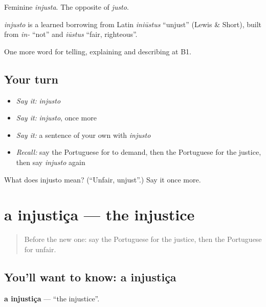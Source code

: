 Feminine \emph{injusta}. The opposite of \emph{justo}.

\begin{cousinweb}
\emph{injusto} is a learned borrowing from Latin \emph{iniūstus} \textquotedblleft{}unjust\textquotedblright{} (Lewis \& Short), built from \emph{in-} \textquotedblleft{}not\textquotedblright{} and \emph{iūstus} \textquotedblleft{}fair, righteous\textquotedblright{}.
\end{cousinweb}

\begin{grammarlens}[title={What you've built}]
One more word for telling, explaining and describing at B1.
\end{grammarlens}

\subsection*{Your turn}
\begin{itemize}
\raggedright
  \item \emph{Say it:} \emph{injusto}
  \item \emph{Say it:} \emph{injusto}, once more
  \item \emph{Say it:} a sentence of your own with \emph{injusto}
  \item \emph{Recall:} say the Portuguese for to demand, then the Portuguese for the justice, then say \emph{injusto} again
\end{itemize}

\begin{tcolorbox}[breakable,colback=teal!4,colframe=teal!35!black,title={Before you move on}]
What does injusto mean? (\textquotedblleft{}Unfair, unjust\textquotedblright{}.) Say it once more.
\end{tcolorbox}
\section[a injustiça]{a injustiça — the injustice}

\label{lesson:PT-C365-injustica}



\begin{quote}
Before the new one: say the Portuguese for the justice, then the Portuguese for unfair.
\end{quote}

\subsection*{You'll want to know: a injustiça}
\textbf{a injustiça} — \textquotedblleft{}the injustice\textquotedblright{}.


